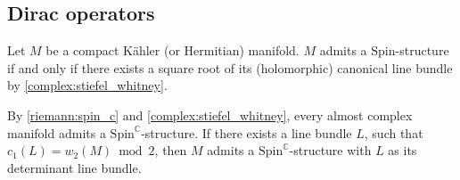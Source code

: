 
\subsection{Dirac operators}

    \begin{property}
        Let $M$ be a compact K\"ahler (or Hermitian) manifold. $M$ admits a $\text{Spin}$-structure if and only if there exists a square root of its (holomorphic) canonical line bundle by \cref{complex:stiefel_whitney}.
    \end{property}

    \begin{property}
        By \cref{riemann:spin_c} and \cref{complex:stiefel_whitney}, every almost complex manifold admits a $\text{Spin}^{\mathbb{C}}$-structure. If there exists a line bundle $L$, such that $c_1(L)=w_2(M)\bmod2$, then $M$ admits a $\text{Spin}^{\mathbb{C}}$-structure with $L$ as its determinant line bundle.
    \end{property}

